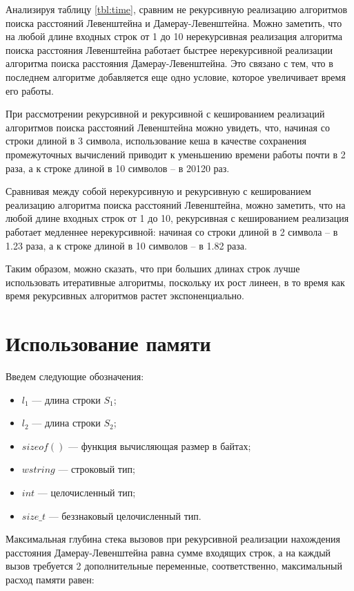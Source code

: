 \clearpage

Анализируя таблицу \ref{tbl:time}, сравним не рекурсивную реализацию алгоритмов поиска расстояний Левенштейна и Дамерау-Левенштейна. Можно заметить, что на любой длине входных строк от 1 до 10 нерекурсивная реализация алгоритма поиска расстояния Левенштейна работает быстрее нерекурсивной реализации алгоритма поиска расстояния Дамерау-Левенштейна. Это связано с тем, что в последнем алгоритме добавляется еще одно условие, которое увеличивает время его работы.

При рассмотрении рекурсивной и рекурсивной с кешированием реализаций алгоритмов поиска расстояний Левенштейна
можно увидеть, что, начиная со строки длиной в 3 символа, использование кеша в качестве сохранения промежуточных вычислений приводит к уменьшению времени работы почти в 2 раза, а к строке длиной в 10 символов -- в 20120 раз.

Сравнивая между собой нерекурсивную и рекурсивную с кешированием реализацию алгоритма поиска расстояний Левенштейна, можно заметить, что на любой длине входных строк от 1 до 10, рекурсивная с кешированием реализация работает медленнее нерекурсивной: начиная со строки длиной в 2 символа -- в 1.23 раза, а к строке длиной в 10 символов -- в 1.82 раза.

Таким образом, можно сказать, что при больших длинах строк лучше использовать итеративные алгоритмы, поскольку их рост линеен, в то время как  время рекурсивных алгоритмов растет экспоненциально.

\section{Использование памяти}

Введем следующие обозначения:
\begin{itemize}[label=--]
	\item$l_1$ --- длина строки $S_{1}$;
	\item$l_2$ --- длина строки $S_{2}$;
	\item$sizeof()$ --- функция вычисляющая размер в байтах;
	\item $wstring$ --- строковый тип;
	\item $int$ --- целочисленный тип;
	\item $size\_t$ --- беззнаковый целочисленный тип.
\end{itemize}

Максимальная глубина стека вызовов при рекурсивной реализации нахождения расстояния Дамерау-Левенштейна равна сумме входящих строк, а на каждый вызов требуется 2 дополнительные переменные, соответственно, максимальный расход памяти равен:

